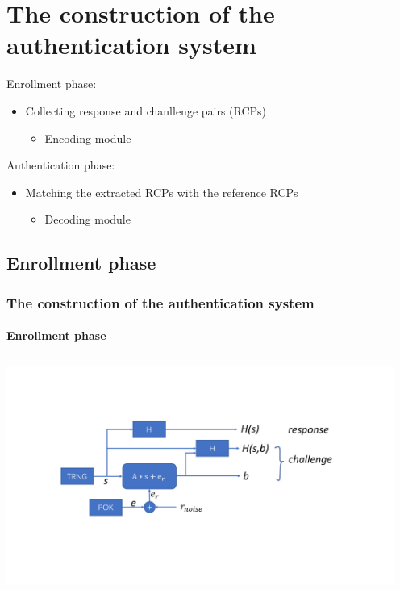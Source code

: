 \documentclass{beamer}
\begin{document}
\section{The construction of the authentication system}


\begin{outlineframe}
	\tableofcontents[currentsection]
\end{outlineframe}
\begin{frame}
	Enrollment phase:
	\begin{itemize}
		\item Collecting response and chanllenge pairs (RCPs)
		\begin{itemize}
			\item Encoding module
		\end{itemize}
	\end{itemize}
	Authentication phase:
	\begin{itemize}
		\item Matching the extracted RCPs with the reference RCPs 
		\begin{itemize}
			\item Decoding module
		\end{itemize}
	\end{itemize}
\end{frame}

\subsection{Enrollment phase}
\begin{frame}
    \frametitle{The construction of the authentication system}
    \framesubtitle{Enrollment phase}
    \includegraphics[width=5in,height=3in]{Enrollment-phase.pdf}
\end{frame}
\end{document}
